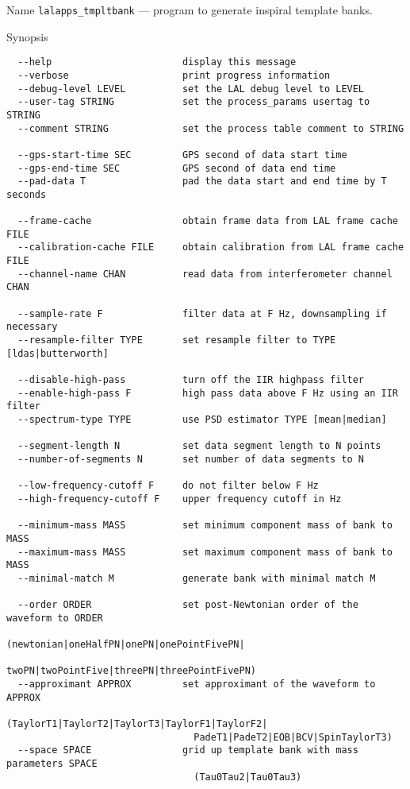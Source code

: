 \begin{entry}
\item[Name]
\verb$lalapps_tmpltbank$ --- program to generate inspiral template banks.

\item[Synopsis]
\begin{verbatim}
  --help                       display this message
  --verbose                    print progress information
  --debug-level LEVEL          set the LAL debug level to LEVEL
  --user-tag STRING            set the process_params usertag to STRING
  --comment STRING             set the process table comment to STRING

  --gps-start-time SEC         GPS second of data start time
  --gps-end-time SEC           GPS second of data end time
  --pad-data T                 pad the data start and end time by T seconds

  --frame-cache                obtain frame data from LAL frame cache FILE
  --calibration-cache FILE     obtain calibration from LAL frame cache FILE
  --channel-name CHAN          read data from interferometer channel CHAN

  --sample-rate F              filter data at F Hz, downsampling if necessary
  --resample-filter TYPE       set resample filter to TYPE [ldas|butterworth]

  --disable-high-pass          turn off the IIR highpass filter
  --enable-high-pass F         high pass data above F Hz using an IIR filter
  --spectrum-type TYPE         use PSD estimator TYPE [mean|median]

  --segment-length N           set data segment length to N points
  --number-of-segments N       set number of data segments to N

  --low-frequency-cutoff F     do not filter below F Hz
  --high-frequency-cutoff F    upper frequency cutoff in Hz

  --minimum-mass MASS          set minimum component mass of bank to MASS
  --maximum-mass MASS          set maximum component mass of bank to MASS
  --minimal-match M            generate bank with minimal match M

  --order ORDER                set post-Newtonian order of the waveform to ORDER
                                 (newtonian|oneHalfPN|onePN|onePointFivePN|
                                 twoPN|twoPointFive|threePN|threePointFivePN)
  --approximant APPROX         set approximant of the waveform to APPROX
                                 (TaylorT1|TaylorT2|TaylorT3|TaylorF1|TaylorF2|
                                 PadeT1|PadeT2|EOB|BCV|SpinTaylorT3)
  --space SPACE                grid up template bank with mass parameters SPACE
                                 (Tau0Tau2|Tau0Tau3)


\end{verbatim}
\end{entry}

